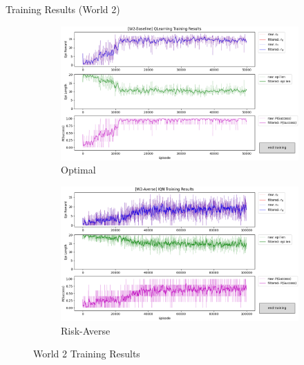 \documentclass[aspectratio=1610, xcolor=dvipsnames]{packages/beamer}
\begin{document}
\begin{frame}{Training Results (World 2)}
     \begin{figure}
     \centering
          \begin{subfigure}[b]{\Wfig\textwidth}  \centering
              \includegraphics[width=\textwidth]{../results/IDQN_W2/Fig_W2_JointQ_Baseline}
              \caption{Optimal} \label{fig:W2baseline}
          \end{subfigure}
          \hfill
         \begin{subfigure}[b]{\Wfig\textwidth} \centering
             \includegraphics[width=\textwidth]{../results/IDQN_W2/Fig_W2_JointQ_Averse}
             \caption{Risk-Averse} \label{fig:W2averse}
         \end{subfigure}
    \caption{World 2 Training Results}
    \label{fig:W2}
    \end{figure}
\end{frame}
\end{document}
